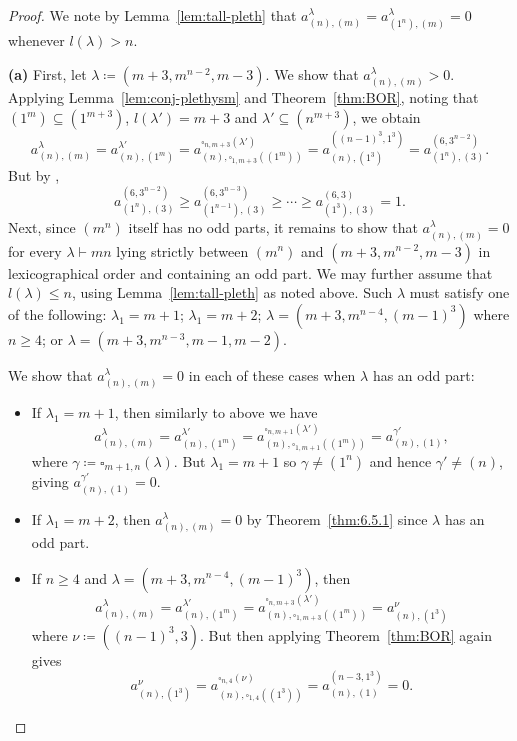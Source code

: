 \documentclass[ALCO, Unicode]{cedram}
\begin{document}
\begin{proof}
	We note by Lemma~\ref{lem:tall-pleth} that $a^\lambda_{(n),(m)}=a^\lambda_{(1^n),(m)}=0$ whenever $l(\lambda)>n$.
	
	\noindent\textbf{(a)} First, let $\lambda\coloneqq (m+3,m^{n-2},m-3)$. We show that $a^\lambda_{(n),(m)}>0$. Applying Lemma~\ref{lem:conj-plethysm} and Theorem~\ref{thm:BOR}, noting that $(1^m)\subseteq(1^{m+3})$, $l(\lambda')=m+3$ and $\lambda'\subseteq(n^{m+3})$, we obtain
	\[ a^\lambda_{(n),(m)} = a^{\lambda'}_{(n),(1^m)} = a^{\square_{n,m+3}(\lambda')}_{(n),\square_{1,m+3}((1^m))} = a^{((n-1)^3,1^3)}_{(n),(1^3)} = a^{(6,3^{n-2})}_{(1^n),(3)}. \]
	But by \cite[Theorem 5.1.1]{dB-thesis},
	\[ a^{(6,3^{n-2})}_{(1^n),(3)} \ge a^{(6,3^{n-3})}_{(1^{n-1}),(3)} \ge \cdots \ge a^{(6,3)}_{(1^3),(3)}=1. \]
	Next, since $(m^n)$ itself has no odd parts, it remains to show that $a^\lambda_{(n),(m)}=0$ for every $\lambda\vdash mn$ lying strictly between $(m^n)$ and $(m+3,m^{n-2},m-3)$ in lexicographical order and containing an odd part. We may further assume that $l(\lambda)\le n$, using Lemma~\ref{lem:tall-pleth} as noted above. Such $\lambda$ must satisfy one of the following: $\lambda_1=m+1$; $\lambda_1=m+2$; $\lambda=(m+3,m^{n-4},(m-1)^3)$ where $n\ge 4$; or $\lambda=(m+3,m^{n-3},m-1,m-2)$.
	
	We show that $a^\lambda_{(n),(m)}=0$ in each of these cases when $\lambda$ has an odd part:
	\begin{itemize}
		\item If $\lambda_1=m+1$, then similarly to above we have
		\[ a^\lambda_{(n),(m)} = a^{\lambda'}_{(n),(1^m)} = a^{\square_{n,m+1}(\lambda')}_{(n),\square_{1,m+1}((1^m))} = a^{\gamma'}_{(n),(1)}, \]
		where $\gamma\coloneqq \square_{m+1,n}(\lambda)$. But $\lambda_1=m+1$ so $\gamma\ne(1^n)$ and hence $\gamma'\ne(n)$, giving $a^{\gamma'}_{(n),(1)}=0$.
		
		\item If $\lambda_1=m+2$, then $a^\lambda_{(n),(m)}=0$ by Theorem~\ref{thm:6.5.1} since $\lambda$ has an odd part.
		
		\item If $n\ge 4$ and $\lambda=(m+3,m^{n-4},(m-1)^3)$, then
		\[ a^\lambda_{(n),(m)} = a^{\lambda'}_{(n),(1^m)} = a^{\square_{n,m+3}(\lambda')}_{(n),\square_{1,m+3}((1^m))} = a^{\nu}_{(n),(1^3)} \]
		where $\nu\coloneqq ((n-1)^3,3)$. But then applying Theorem~\ref{thm:BOR} again gives
		\[ a^\nu_{(n),(1^3)} = a^{\square_{n,4}(\nu)}_{(n),\square_{1,4}((1^3))} = a^{(n-3,1^3)}_{(n),(1)} = 0. \]
		

\end{itemize}
\end{proof}
\end{document}
